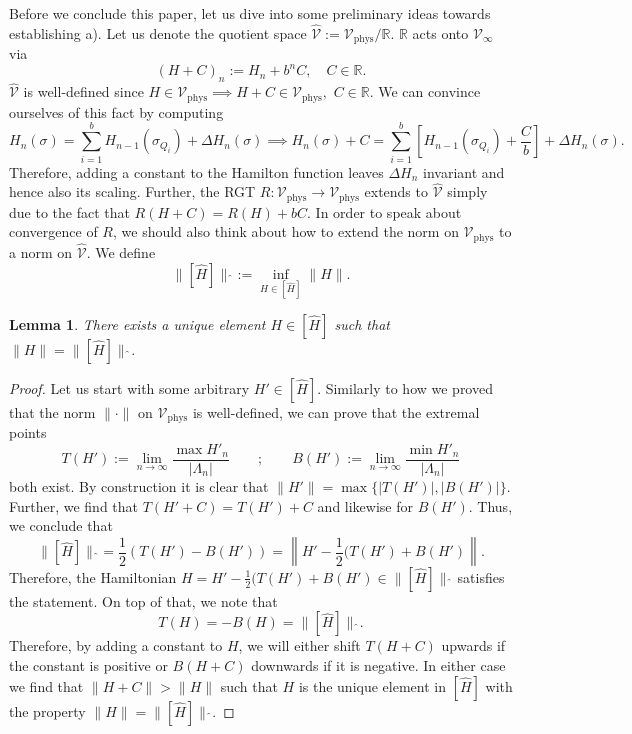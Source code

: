 \documentclass{article}
\newtheorem{lemma}[theorem]{Lemma}
\newcommand{\phys}{\mathrm{phys}}
\begin{document}
Before we conclude this paper, let us dive into some preliminary ideas towards establishing a). Let us denote the quotient space $\hat {\mathcal{V}}:=\mathcal{V}_\phys/\mathds{R}$. $\mathds{R}$ acts onto $\mathcal{V}_\infty$ via
\begin{equation}
    (H+C)_n:=H_n+b^nC,\quad C\in\mathds{R}.
\end{equation}
$\hat{\mathcal{V}}$ is well-defined since $H\in \mathcal{V}_\phys\implies H+C\in \mathcal{V}_\phys,\,\,C\in\mathds{R}$. We can convince ourselves of this fact by computing
\begin{equation}\label{Eq2}
    H_n(\sigma)=\sum_{i=1}^bH_{n-1}(\sigma_{Q_i})+\Delta H_n(\sigma)\implies H_n(\sigma)+C=\sum_{i=1}^b\left[H_{n-1}(\sigma_{Q_i})+\frac{C}{b}\right]+\Delta H_n(\sigma).
\end{equation}
Therefore, adding a constant to the Hamilton function leaves $\Delta H_n$ invariant and hence also its scaling. Further, the RGT $R:\mathcal{V}_\phys\to \mathcal{V}_\phys$ extends to $\hat{\mathcal{V}}$ simply due to the fact that $R(H+C)=R(H)+bC$. In order to speak about convergence of $R$, we should also think about how to extend the norm on $\mathcal{V}_\phys$ to a norm on $\hat{\mathcal{V}}$. We define
\begin{equation}
    \|[\hat H]\|\hat{\,}:=\inf_{H\in[\hat H]}\|H\|.
\end{equation}

\begin{lemma}\label{Lem2}
    There exists a unique element $H\in[\hat H]$ such that $\|H\|=\|[\hat H]\|\hat{\,}$.
\end{lemma}

\begin{proof}
    Let us start with some arbitrary $H'\in[\hat H]$. Similarly to how we proved that the norm $\|\cdot\|$ on $\mathcal{V}_\phys$ is well-defined, we can prove that the extremal points 
    \begin{equation}
        T(H'):=\lim_{n\to\infty}\frac{\max H'_n}{|\Lambda_n|}\qquad;\qquad B(H'):=\lim_{n\to\infty}\frac{\min H'_n}{|\Lambda_n|}
    \end{equation}
    both exist. By construction it is clear that $\|H'\|=\max\{|T(H')|,|B(H')|\}$. Further, we find that $T(H'+C)=T(H')+C$ and likewise for $B(H')$. Thus, we conclude that
    \begin{equation}
        \|[\hat H]\|\hat{\,}=\frac{1}{2}(T(H')-B(H'))=\left\|H'-\frac{1}{2}(T(H')+B(H')\right\|.
    \end{equation}
    Therefore, the Hamiltonian $H=H'-\frac{1}{2}(T(H')+B(H')\in\|[\hat H]\|\hat{\,}$ satisfies the statement. On top of that, we note that 
    \begin{equation}
        T(H)=-B(H)=\|[\hat H]\|\hat{\,}.
    \end{equation}
    Therefore, by adding a constant to $H$, we will either shift $T(H+C)$ upwards if the constant is positive or $B(H+C)$ downwards if it is negative. In either case we find that $\|H+C\|>\|H\|$ such that $H$ is the unique element in $[\hat H]$ with the property $\|H\|=\|[\hat H]\|\hat{\,}$.
\end{proof}
\end{document}
